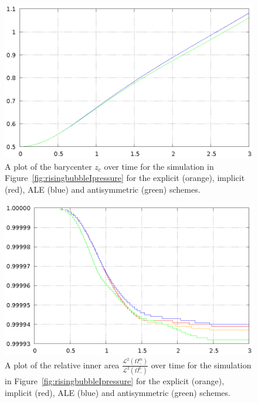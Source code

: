 \begin{figure}[htbp]
\centering
\includegraphics[width=.45\textwidth]
{figures/navier_stokes/rising_bubble_I_barycenter.ps}
\caption[Navier--Stokes rising bubble I barycenter]
{A plot of the barycenter $z_c$ over time for the simulation in
Figure~\ref{fig:risingbubbleIpressure} for the explicit (orange), implicit
(red), ALE (blue) and antisymmetric (green) schemes.}
\label{fig:risingbubbleIbarycenter}
\end{figure}

\begin{figure}[htbp]
\centering
\includegraphics[width=.45\textwidth]
{figures/navier_stokes/rising_bubble_I_inner_volume.ps}
\caption[Navier--Stokes rising bubble I inner area]
{A plot of the relative inner area
$\frac{\mathcal{L}^2(\Omega^m_-)}{\mathcal{L}^2(\Omega^0_-)}$ over time for the
simulation in Figure~\ref{fig:risingbubbleIpressure} for the explicit
(orange), implicit (red), ALE (blue) and antisymmetric (green) schemes.}
\label{fig:risingbubbleIinnervolume}
\end{figure}


